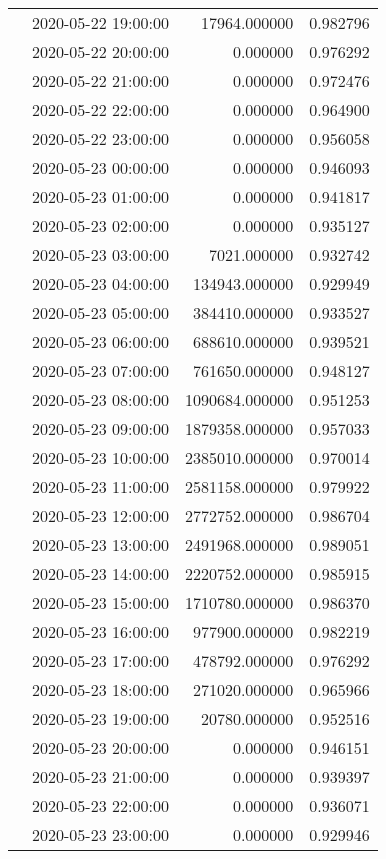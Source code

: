 \begin{tabular}{llrr}
 & 2020-05-22 19:00:00 & 17964.000000 & 0.982796 \\
 & 2020-05-22 20:00:00 & 0.000000 & 0.976292 \\
 & 2020-05-22 21:00:00 & 0.000000 & 0.972476 \\
 & 2020-05-22 22:00:00 & 0.000000 & 0.964900 \\
 & 2020-05-22 23:00:00 & 0.000000 & 0.956058 \\
 & 2020-05-23 00:00:00 & 0.000000 & 0.946093 \\
 & 2020-05-23 01:00:00 & 0.000000 & 0.941817 \\
 & 2020-05-23 02:00:00 & 0.000000 & 0.935127 \\
 & 2020-05-23 03:00:00 & 7021.000000 & 0.932742 \\
 & 2020-05-23 04:00:00 & 134943.000000 & 0.929949 \\
 & 2020-05-23 05:00:00 & 384410.000000 & 0.933527 \\
 & 2020-05-23 06:00:00 & 688610.000000 & 0.939521 \\
 & 2020-05-23 07:00:00 & 761650.000000 & 0.948127 \\
 & 2020-05-23 08:00:00 & 1090684.000000 & 0.951253 \\
 & 2020-05-23 09:00:00 & 1879358.000000 & 0.957033 \\
 & 2020-05-23 10:00:00 & 2385010.000000 & 0.970014 \\
 & 2020-05-23 11:00:00 & 2581158.000000 & 0.979922 \\
 & 2020-05-23 12:00:00 & 2772752.000000 & 0.986704 \\
 & 2020-05-23 13:00:00 & 2491968.000000 & 0.989051 \\
 & 2020-05-23 14:00:00 & 2220752.000000 & 0.985915 \\
 & 2020-05-23 15:00:00 & 1710780.000000 & 0.986370 \\
 & 2020-05-23 16:00:00 & 977900.000000 & 0.982219 \\
 & 2020-05-23 17:00:00 & 478792.000000 & 0.976292 \\
 & 2020-05-23 18:00:00 & 271020.000000 & 0.965966 \\
 & 2020-05-23 19:00:00 & 20780.000000 & 0.952516 \\
 & 2020-05-23 20:00:00 & 0.000000 & 0.946151 \\
 & 2020-05-23 21:00:00 & 0.000000 & 0.939397 \\
 & 2020-05-23 22:00:00 & 0.000000 & 0.936071 \\
 & 2020-05-23 23:00:00 & 0.000000 & 0.929946 \\

\end{tabular}
